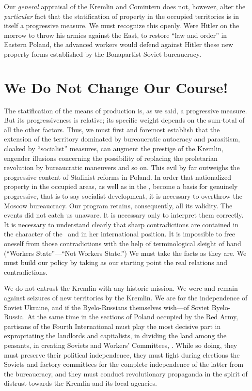 Our \emph{general} appraisal of the Kremlin and Comintern does not, however, alter the \emph{particular} fact that the statification of property in the occupied territories is in itself a progressive measure. We must recognize this openly. Were Hitler on the morrow to throw his armies against the East, to restore “law and order” in Eastern Poland, the advanced workers would defend against Hitler these new property forms established by the Bonapartist Soviet bureaucracy.

\enlargethispage{-1 \baselineskip}

\section*{We Do Not Change Our Course!}

The statification of the means of production is, as we said, a progressive measure. But its progressiveness is relative; its specific weight depends on the sum-total of all the other factors. Thus, we must first and foremost establish that the extension of the territory dominated by bureaucratic autocracy and parasitism, cloaked by “socialist” measures, can augment the prestige of the Kremlin, engender illusions concerning the possibility of replacing the proletarian revolution by bureaucratic maneuvers and so on. This evil by far outweighs the progressive content of Stalinist reforms in Poland. In order that nationalized property in the occupied areas, as well as in the \USSR, become a basis for genuinely progressive, that is to say socialist development, it is necessary to overthrow the Moscow bureaucracy. Our program retains, consequently, all its validity. The events did not catch us unaware. It is necessary only to interpret them correctly. It is necessary to understand clearly that sharp contradictions are contained in the character of the \USSR\ and in her international position. It is impossible to free oneself from those contradictions with the help of terminological sleight of hand (“Workers State”---“Not Workers State.”) We must take the facts as they are. We must build our policy by taking as our starting point the real relations and contradictions.

We do not entrust the Kremlin with any historic mission. We were and remain against seizures of new territories by the Kremlin. We are for the independence of Soviet Ukraine, and if the Byelo-Russians themselves wish---of Soviet Byelo-Russia. At the same time in the sections of Poland occupied by the Red Army, partisans of the Fourth International must play the most decisive part in expropriating the landlords and capitalists, in dividing the land among the peasants, in creating Soviets and Workers’ Committees, \etc. While so doing, they must preserve their political independence, they must fight during elections the Soviets and factory committees for the complete independence of the latter from the bureaucracy, and they must conduct revolutionary propaganda in the spirit of distrust towards the Kremlin and its local agencies.

